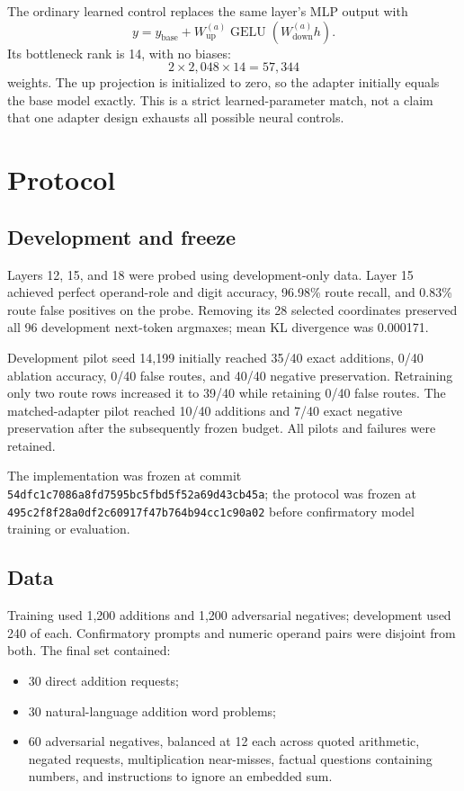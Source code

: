 \documentclass[11pt]{article}
\newcommand{\code}[1]{\texttt{#1}}
\begin{document}
The ordinary learned control replaces the same layer's MLP output with
\[
  y = y_{\mathrm{base}} +
  W_{\mathrm{up}}^{(a)}
  \operatorname{GELU}(W_{\mathrm{down}}^{(a)}h).
\]
Its bottleneck rank is 14, with no biases:
\[
  2\times2{,}048\times14 = 57{,}344
\]
weights. The up projection is initialized to zero, so the adapter initially
equals the base model exactly. This is a strict learned-parameter match, not a
claim that one adapter design exhausts all possible neural controls.

\section{Protocol}

\subsection{Development and freeze}

Layers 12, 15, and 18 were probed using development-only data. Layer 15
achieved perfect operand-role and digit accuracy, 96.98\% route recall, and
0.83\% route false positives on the probe. Removing its 28 selected coordinates
preserved all 96 development next-token argmaxes; mean KL divergence was
0.000171.

Development pilot seed 14,199 initially reached 35/40 exact additions, 0/40
ablation accuracy, 0/40 false routes, and 40/40 negative preservation.
Retraining only two route rows increased it to 39/40 while retaining 0/40 false
routes. The matched-adapter pilot reached 10/40 additions and 7/40 exact
negative preservation after the subsequently frozen budget. All pilots and
failures were retained.

The implementation was frozen at commit
\code{54dfc1c7086a8fd7595bc5fbd5f52a69d43cb45a}; the protocol was frozen at
\code{495c2f8f28a0df2c60917f47b764b94cc1c90a02} before confirmatory model
training or evaluation.

\subsection{Data}

Training used 1,200 additions and 1,200 adversarial negatives; development used
240 of each. Confirmatory prompts and numeric operand pairs were disjoint from
both. The final set contained:

\begin{itemize}
\item 30 direct addition requests;
\item 30 natural-language addition word problems;
\item 60 adversarial negatives, balanced at 12 each across quoted arithmetic,
      negated requests, multiplication near-misses, factual questions
      containing numbers, and instructions to ignore an embedded sum.
\end{itemize}
\end{document}
